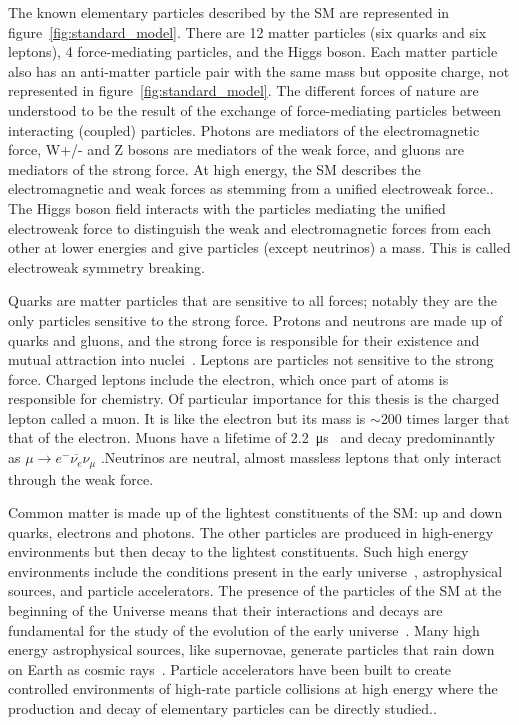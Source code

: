 The known elementary particles described by the SM are represented in figure~\ref{fig:standard_model}.  There are 12 matter particles (six quarks and six leptons), 4 force-mediating particles, and the Higgs boson. Each matter particle also has an anti-matter particle pair with the same mass but opposite charge, not represented in figure~\ref{fig:standard_model}. The different forces of nature are understood to be the result of the exchange of force-mediating particles between interacting (coupled) particles. Photons are mediators of the electromagnetic force, W+/- and Z bosons are mediators of the weak force, and gluons are mediators of the strong force. At high energy, the SM describes the electromagnetic and weak forces as stemming from a unified electroweak force.. The Higgs boson field interacts with the particles mediating the unified electroweak force to distinguish the weak and electromagnetic forces from each other at lower energies and give particles (except neutrinos) a mass. This is called electroweak symmetry breaking. 

Quarks are matter particles that are sensitive to all forces; notably they are the only particles sensitive to the strong force. Protons and neutrons are made up of quarks and gluons, and the strong force is responsible for their existence and mutual attraction into nuclei~\cite{bertulani_nuclear_2007}. Leptons are particles not sensitive to the strong force. Charged leptons include the electron, which once part of atoms is responsible for chemistry. Of particular importance for this thesis is the charged lepton called a muon. It is like the electron but its mass is $\sim$200 times larger that that of the electron. Muons have a lifetime of \SI{2.2}{\micro\second}~\cite{zyla_review_2020} and decay predominantly as $\mu \rightarrow e^{-}\overline{\nu_{e}}\nu_{\mu}$ .Neutrinos are neutral, almost massless leptons that only interact through the weak force. 

Common matter is made up of the lightest constituents of the SM: up and down quarks, electrons and photons. The other particles are produced in high-energy environments but then decay to the lightest constituents. Such high energy environments include the conditions present in the early universe~\cite{carroll_introduction_2007}, astrophysical sources, and particle accelerators. The presence of the particles of the SM at the beginning of the Universe means that their interactions and decays are fundamental for the study of the evolution of the early universe~\cite{carroll_introduction_2007}. Many high energy astrophysical sources, like supernovae, generate particles that rain down on Earth as cosmic rays~\cite{boezio_chemical_2012}. Particle accelerators have been built to create controlled environments of high-rate particle collisions at high energy where the production and decay of elementary particles can be directly studied..

